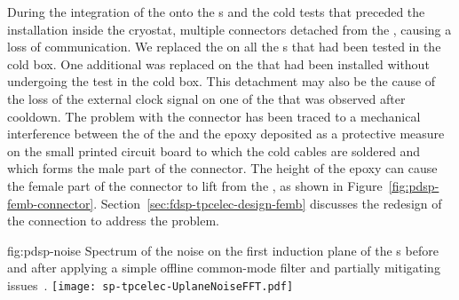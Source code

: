 \begin{comment}During the integration of the \dwords{femb} onto the \dword{apa}s 
and the cold tests that preceded the \dword{apa}s installation
inside the \dword{pdsp} cryostat a problem occurred %
on the 
connection between the cold readout and control cables and the
\dwords{femb}. In multiple cases the connector %
detached from
the \dword{femb} causing a loss of communication. 
\end{comment}
During the integration of the  onto the s 
and the cold tests that preceded the  installation
inside the  cryostat,  multiple connectors  
detached from
the , causing a loss of communication.  
We replaced the  %
on all the s that had been tested in the cold box. %
One additional  was 
replaced on the  that had been installed without undergoing 
the test in the cold box. This %
detachment may also be the cause
of the loss of the external clock signal on one of the 
that was observed after cooldown. %
%
The problem 
with the connector has been traced to a mechanical interference between 
the  of the  and the epoxy deposited as a protective measure on the small printed circuit
board to which the cold cables are soldered and which forms the 
male part of the connector. The height of the epoxy can cause 
the female part of the connector to lift from the ,
as shown in 
Figure~\ref{fig:pdsp-femb-connector}. %
Section~\ref{sec:fdsp-tpcelec-design-femb} discusses the redesign of the connection to address the problem.


\begin{dunefigure}
{fig:pdsp-noise}
{Spectrum of the noise on the first induction plane of the  s before
and after applying a simple offline common-mode filter and partially mitigating  issues~\cite{pend_PDSP_PerfPaper}.}
\texttt{[image: sp-tpcelec-UplaneNoiseFFT.pdf]}
\end{dunefigure}

